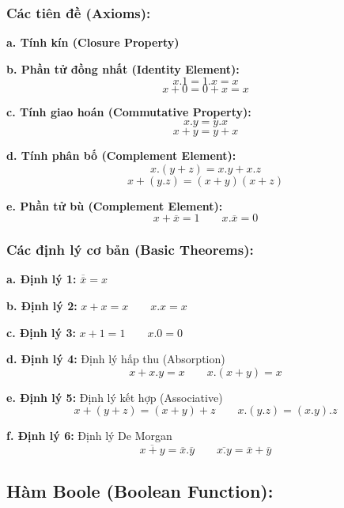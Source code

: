 \subsubsection{Các tiên đề (Axioms):}
\textbf{a. Tính kín (Closure Property)}

\textbf{b. Phần tử đồng nhất (Identity Element):}
\[
    x.1 = 1.x = x 
\]
\[
    x+0 = 0+x = x
\]

\textbf{c. Tính giao hoán (Commutative Property):}
\[
    x.y = y.x
\]
\[
    x+y = y+x
\]

\textbf{d. Tính phân bố (Complement Element):}
\[
    x.(y+z) = x.y + x.z
\]
\[
    x+(y.z)=(x+y)(x+z)
\]

\textbf{e. Phần tử bù (Complement Element):}
\[
    x+\overline{x}=1 \qquad x.\overline{x} = 0
\]
\subsubsection{Các định lý cơ bản (Basic Theorems):}
\textbf{a. Định lý 1:} $\overline{\overline{x}} = x$

\textbf{b. Định lý 2:} $x+x = x \qquad x.x=x$

\textbf{c. Định lý 3:} $x+1=1 \qquad x.0 = 0$

\textbf{d. Định lý 4:} Định lý hấp thu (Absorption)
\[
    x+x.y = x \qquad x.(x+y) = x
\]

\textbf{e. Định lý 5:} Định lý kết hợp (Associative)
\[
    x+(y+z) = (x+y) + z \qquad x.(y.z) = (x.y).z
\]

\textbf{f. Định lý 6:} Định lý De Morgan
\[
    \overline{x+y} = \overline{x}.\overline{y} \qquad \overline{x.y} = \overline{x}+\overline{y}
\]
\subsection{Hàm Boole (Boolean Function):}
